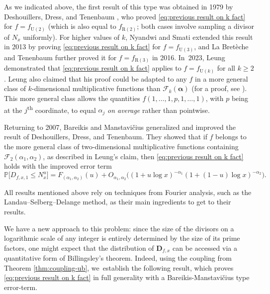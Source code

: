 \documentclass[JEP,XML,SOM,Unicode,published]{cedram}
\newcommand{\bD}{{\boldsymbol D}}
\newcommand{\PP}{\mathbb{P}}
\newcommand{\boldalpha}{\boldsymbol{\alpha}}
\newcommand{\bg}{\big}
\newcommand{\bgg}{\Big}
\theoremstyle{plain}
\theoremstyle{definition}
\begin{document}
As we indicated above, the first result of this type was obtained in 1979 by Deshouillers, Dress, and Tenenbaum \cite{DDT79}, who proved \eqref{eq:previous result on k fact} for $f = f_{\mathrm U(2)}$ (which is also equal to $f_{\mathrm R(2)}$; both cases involve sampling a divisor of $N_x$ uniformly). For higher values of $k$, Nyandwi and Smati \cite{NyandwiSmati13} extended this result in 2013 by proving \eqref{eq:previous result on k fact} for $f = f_{\mathrm U(3)}$, and La Bretèche and Tenenbaum \cite{delaBretecheTenenbaum16} further proved it for $f = f_{\mathrm R(3)}$ in 2016. In~2023, Leung \cite{Ken22} demonstrated that \eqref{eq:previous result on k fact} applies to $f = f_{\mathrm U(k)}$ for all $k \ge 2$. Leung also claimed that his proof could be adapted to any $f$ in a more general class of $k$-dimensional multiplicative functions than $\mathcal F_k(\boldalpha)$ (for a proof, see \cite{KenWeb24}). This more general class allows the quantities $f(1, \ldots, 1, p, 1, \ldots, 1)$, with $p$ being at the $j$\textsuperscript{th} coordinate, to equal $\alpha_j$ {\it on average} rather than pointwise.

Returning to 2007, Bareikis and Manstavi\v{c}ius \cite{BareikisManstavicius07} generalized and improved the result of Deshouillers, Dress, and Tenenbaum. They showed that if $f$ belongs to the more general class of two-dimensional multiplicative functions containing $\mathcal F_2(\alpha_1, \alpha_2)$, as described in Leung's claim, then \eqref{eq:previous result on k fact} holds with the improved error term
\[
\PP\bg[D_{f, x, 1} \le N_x^u\bg] = F_{(\alpha_1,\alpha_2)}(u) + O_{\alpha_1, \alpha_2}\bgg((1 + u\log x)^{-\alpha_1}(1 + (1-u)\log x)^{-\alpha_2}\bgg).
\]

All results mentioned above rely on techniques from Fourier analysis, such as the Landau--Selberg--Delange method, as their main ingredients to get to their results.

We have a new approach to this problem: since the size of the divisors on a logarithmic scale of any integer is entirely determined by the size of its prime factors, one might expect that the distribution of $\bD_{f, x}$ can be accessed via a quantitative form of Billingsley's theorem. Indeed, using the coupling from Theorem \ref{thm:coupling-ub}, we~establish the following result, which proves \eqref{eq:previous result on k fact} in full generality with a Bareikis-Manstavi\v{c}ius type error-term.
\end{document}
